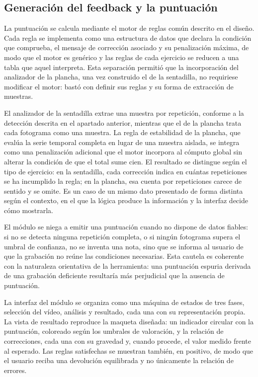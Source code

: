 \documentclass[12pt,a4paper,twoside,openright]{book}
\begin{document}
    \subsection{Generación del feedback y la puntuación}

    La puntuación se calcula mediante el motor de reglas común descrito en el
    diseño. Cada regla se implementa como una estructura de datos que declara la
    condición que comprueba, el mensaje de corrección asociado y su penalización
    máxima, de modo que el motor es genérico y las reglas de cada ejercicio se
    reducen a una tabla que aquel interpreta. Esta separación permitió que la
    incorporación del analizador de la plancha, una vez construido el de la
    sentadilla, no requiriese modificar el motor: bastó con definir sus reglas y
    su forma de extracción de muestras.

    El analizador de la sentadilla extrae una muestra por repetición, conforme a
    la detección descrita en el apartado anterior, mientras que el de la plancha
    trata cada fotograma como una muestra. La regla de
    estabilidad de la plancha, que evalúa la serie temporal completa en lugar de
    una muestra aislada, se integra como una penalización adicional que el motor
    incorpora al cómputo global sin alterar la condición de que el total sume
    cien. El resultado se distingue según el tipo de ejercicio: en la sentadilla,
    cada corrección indica en cuántas repeticiones se ha incumplido la regla; en
    la plancha, esa cuenta por repeticiones carece de sentido y se omite. Es un
    caso de un mismo dato presentado de forma distinta según el contexto, en el
    que la lógica produce la información y la interfaz decide cómo mostrarla.

    El módulo se niega a emitir una puntuación cuando no dispone de datos
    fiables: si no se detecta ninguna repetición completa, o si ningún fotograma
    supera el umbral de confianza, no se inventa una nota, sino que se informa al
    usuario de que la grabación no reúne las condiciones necesarias. Esta cautela
    es coherente con la naturaleza orientativa de la herramienta: una puntuación
    espuria derivada de una grabación deficiente resultaría más perjudicial que
    la ausencia de puntuación.

    La interfaz del módulo se organiza como una máquina de estados de tres fases,
    selección del vídeo, análisis y resultado, cada una con su
    representación propia. La vista de resultado reproduce la maqueta diseñada:
    un indicador circular con la puntuación, coloreado según los umbrales de
    valoración, y la relación de correcciones, cada una con su gravedad y, cuando
    procede, el valor medido frente al esperado. Las reglas satisfechas se
    muestran también, en positivo, de modo que el usuario reciba una devolución
    equilibrada y no únicamente la relación de errores.
\end{document}
